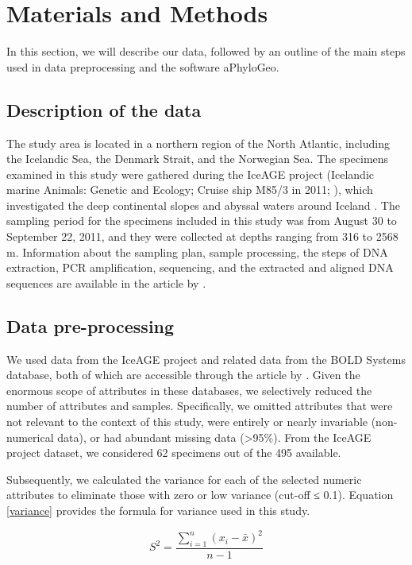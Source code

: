 \section{Materials and Methods}\label{materials-methods}
In this section, we will describe our data, followed by an outline of the main steps used in data preprocessing and the software aPhyloGeo. 

\subsection{Description of the data}
The study area is located in a northern region of the North Atlantic, including the Icelandic Sea, the Denmark Strait, and the Norwegian Sea. The specimens examined in this study were gathered during the IceAGE project (Icelandic marine Animals: Genetic and Ecology; Cruise ship M85/3 in 2011; \cite{brix_iceage_2014}), which investigated the deep continental slopes and abyssal waters around Iceland \citep{meisner_prefacebiodiversity_2018}. The sampling period for the specimens included in this study was from August 30 to September 22, 2011, and they were collected at depths ranging from 316 to 2568 m.  Information about the sampling plan, sample processing, the steps of DNA extraction, PCR amplification, sequencing, and the extracted and aligned DNA sequences are available in the article by \citep{uhlir_adding_2021}.

\subsection{Data pre-processing}
We used data from the IceAGE project and related data from the BOLD Systems database, both of which are accessible through the article by \citep{uhlir_adding_2021}. Given the enormous scope of attributes in these databases, we selectively reduced the number of attributes and samples. Specifically, we omitted attributes that were not relevant to the context of this study, were entirely or nearly invariable (non-numerical data), or had abundant missing data (>95\%). From the IceAGE project dataset, we considered 62 specimens out of the 495 available.

Subsequently, we calculated the variance for each of the selected numeric attributes to eliminate those with zero or low variance (cut-off ≤ 0.1). Equation \ref{variance} provides the formula for variance used in this study.

\begin{equation}\label{variance}
    S^2 = \frac{\sum_{i=1}^{n} (x_i - \bar{x})^2}{n-1}
\end{equation}

